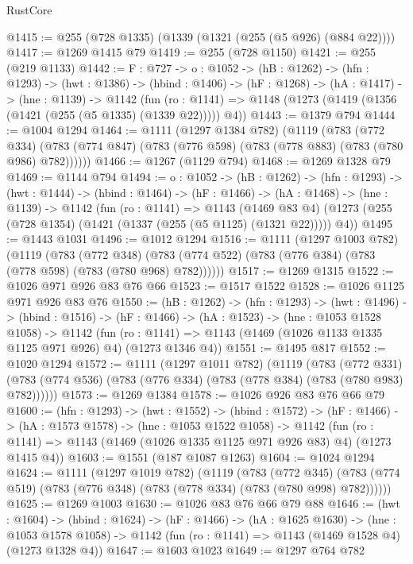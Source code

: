 \begin{lexlean}{RustCore}
\begin{coremodule}
@1415 := @255 (@728 @1335) (@1339 (@1321 (@255 (@5 @926) (@884 @22))))
@1417 := @1269 @1415 @79
@1419 := @255 (@728 @1150)
@1421 := @255 (@219 @1133)
@1442 := {F : @727} ->
  {o : @1052} ->
  (hB : @1262) ->
  (hfn : @1293) ->
  (hwt : @1386) ->
  (hbind : @1406) ->
  (hF : @1268) ->
  (hA : @1417) ->
  (hne : @1139) ->
  @1142 (fun (ro : @1141) => @1148 (@1273 (@1419 (@1356 (@1421 (@255 (@5 @1335) (@1339 @22))))) @4))
@1443 := @1379 @794
@1444 := @1004 @1294
@1464 := @1111
    (@1297 @1384 @782)
    (@1119
      (@783
        (@772 @334)
        (@783 (@774 @847) (@783 (@776 @598) (@783 (@778 @883) (@783 (@780 @986) @782))))))
@1466 := @1267 (@1129 @794)
@1468 := @1269 @1328 @79
@1469 := @1144 @794
@1494 := {o : @1052} ->
  (hB : @1262) ->
  (hfn : @1293) ->
  (hwt : @1444) ->
  (hbind : @1464) ->
  (hF : @1466) ->
  (hA : @1468) ->
  (hne : @1139) ->
  @1142
    (fun (ro : @1141) =>
    @1143
      (@1469 @83 @4)
      (@1273 (@255 (@728 @1354) (@1421 (@1337 (@255 (@5 @1125) (@1321 @22))))) @4))
@1495 := @1443 @1031
@1496 := @1012 @1294
@1516 := @1111
    (@1297 @1003 @782)
    (@1119
      (@783
        (@772 @348)
        (@783 (@774 @522) (@783 (@776 @384) (@783 (@778 @598) (@783 (@780 @968) @782))))))
@1517 := @1269 @1315
@1522 := @1026 @971 @926 @83 @76 @66
@1523 := @1517 @1522
@1528 := @1026 @1125 @971 @926 @83 @76
@1550 := (hB : @1262) ->
  (hfn : @1293) ->
  (hwt : @1496) ->
  (hbind : @1516) ->
  (hF : @1466) ->
  (hA : @1523) ->
  (hne : @1053 @1528 @1058) ->
  @1142 (fun (ro : @1141) => @1143 (@1469 (@1026 @1133 @1335 @1125 @971 @926) @4) (@1273 @1346 @4))
@1551 := @1495 @817
@1552 := @1020 @1294
@1572 := @1111
    (@1297 @1011 @782)
    (@1119
      (@783
        (@772 @331)
        (@783 (@774 @536) (@783 (@776 @334) (@783 (@778 @384) (@783 (@780 @983) @782))))))
@1573 := @1269 @1384
@1578 := @1026 @926 @83 @76 @66 @79
@1600 := (hfn : @1293) ->
  (hwt : @1552) ->
  (hbind : @1572) ->
  (hF : @1466) ->
  (hA : @1573 @1578) ->
  (hne : @1053 @1522 @1058) ->
  @1142 (fun (ro : @1141) => @1143 (@1469 (@1026 @1335 @1125 @971 @926 @83) @4) (@1273 @1415 @4))
@1603 := @1551 (@187 @1087 @1263)
@1604 := @1024 @1294
@1624 := @1111
    (@1297 @1019 @782)
    (@1119
      (@783
        (@772 @345)
        (@783 (@774 @519) (@783 (@776 @348) (@783 (@778 @334) (@783 (@780 @998) @782))))))
@1625 := @1269 @1003
@1630 := @1026 @83 @76 @66 @79 @88
@1646 := (hwt : @1604) ->
  (hbind : @1624) ->
  (hF : @1466) ->
  (hA : @1625 @1630) ->
  (hne : @1053 @1578 @1058) -> @1142 (fun (ro : @1141) => @1143 (@1469 @1528 @4) (@1273 @1328 @4))
@1647 := @1603 @1023
@1649 := @1297 @764 @782

\end{coremodule}
\end{lexlean}
